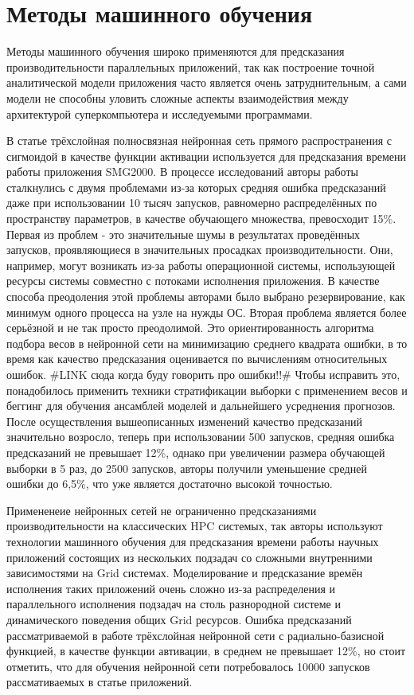 	\section{Методы машинного обучения}
		Методы машинного обучения широко применяются для предсказания производительности параллельных приложений, так как построение точной аналитической модели приложения часто является очень затруднительным, а сами модели не способны уловить сложные аспекты взаимодействия между архитектурой суперкомпьютера и исследуемыми программами.

		В статье \cite{ML_SMG2000} трёхслойная полносвязная нейронная сеть прямого распространения с сигмоидой в качестве функции активации используется для предсказания времени работы приложения SMG2000. В процессе исследований авторы работы сталкнулись с двумя проблемами из-за которых средняя ошибка предсказаний даже при использовании 10 тысяч запусков, равномерно распределённых по пространству параметров, в качестве обучающего множества, превосходит 15\%. Первая из проблем - это значительные шумы в результатах проведённых запусков, проявляющиеся в значительных просадках производительности. Они, например, могут возникать из-за работы операционной системы, использующей ресурсы системы совместно с потоками исполнения приложения. В качестве способа преодоления этой проблемы авторами было выбрано резервирование, как минимум одного процесса на узле на нужды ОС. Вторая проблема является более серьёзной и не так просто преодолимой. Это ориентированность алгоритма подбора весов в нейронной сети на минимизацию среднего квадрата ошибки, в то время как качество предсказания оценивается по вычислениям относительных ошибок. \#LINK сюда когда буду говорить про ошибки!!\#
		Чтобы исправить это, понадобилось применить техники стратификации выборки с применением весов и беггинг для обучения ансамблей моделей и дальнейшего усреднения прогнозов. После осуществления вышеописанных изменений качество предсказаний значительно возросло, теперь при использовании 500 запусков, средняя ошибка предсказаний не превышает 12\%, однако при увеличении размера обучающей выборки в 5 раз, до 2500 запусков, авторы получили уменьшение средней ошибки до 6,5\%, что уже является достаточно высокой точностью.

		Примененеие нейронных сетей не ограниченно предсказаниями производительности на классических HPC системых, так авторы \cite{ML_Grid} используют технологии машинного обучения для предсказания времени работы научных приложений состоящих из нескольких подзадач со сложными внутренними зависимостями на Grid системах. Моделирование и предсказание времён исполнения таких приложений очень сложно из-за распределения и параллельного исполнения подзадач на столь разнородной системе и динамического поведения общих Grid ресурсов. Ошибка предсказаний рассматриваемой в работе трёхслойная нейронной сети с радиально-базисной функцией, в качестве функции автивации, в среднем не превышает 12\%, но стоит отметить, что для обучения нейронной сети потребовалось 10000 запусков рассмативаемых в статье приложений.

